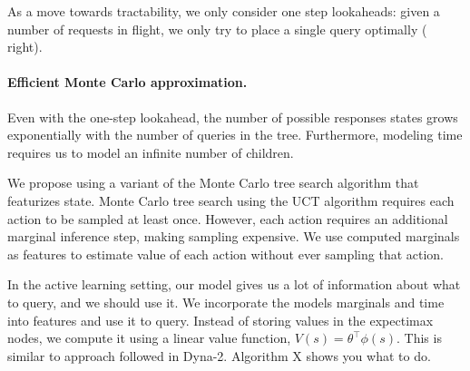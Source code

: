 %
As a move towards tractability, we only consider one step lookaheads: given a number of requests in flight, we only try to place a single query optimally ( right). 

\paragraph{Efficient Monte Carlo approximation.}

Even with the one-step lookahead, the number of possible responses states grows exponentially with the number of queries in the tree.
Furthermore, modeling time requires us to model an infinite number of children.

We propose using a variant of the Monte Carlo tree search algorithm\needcite{}  that featurizes state.
Monte Carlo tree search using the UCT algorithm requires each action to be sampled at least once.
However, each action requires an additional marginal inference step, making sampling expensive.
We use computed marginals as features to estimate value of each action without ever sampling that action.

In the active learning setting, our model gives us a lot of information about what to query, and we should use it.
We incorporate the models marginals and time into features and use it to query.
Instead of storing values in the expectimax nodes, we compute it using a linear value function, $V(s) = \theta^\top \phi(s)$.
This is similar to approach followed in Dyna-2.
Algorithm X shows you what to do.

